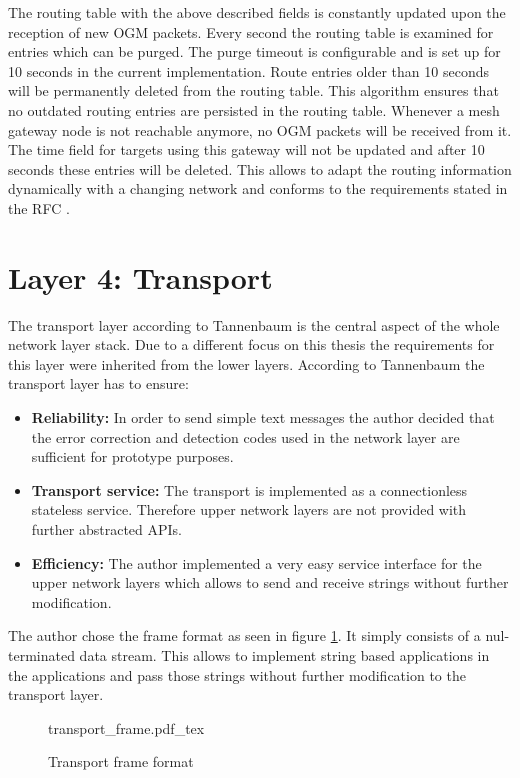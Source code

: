 The routing table with the above described fields is constantly updated upon the reception of new OGM packets. Every second the routing table is examined for entries which can be purged. The purge timeout is configurable and is set up for 10 seconds in the current implementation. Route entries older than 10 seconds will be permanently deleted from the routing table. This algorithm ensures that no outdated routing entries are persisted in the routing table. Whenever a mesh gateway node is not reachable anymore, no OGM packets will be received from it. The time field for targets using this gateway will not be updated and after 10 seconds these entries will be deleted. This allows to adapt the routing information dynamically with a changing network and conforms to the requirements stated in the RFC \cite{batmanrfc}.

\section{Layer 4: Transport}%
The transport layer according to Tannenbaum \cite{tannenbaum} is the central aspect of the whole network layer stack. Due to a different focus on this thesis the requirements for this layer were inherited from the lower layers. According to Tannenbaum the transport layer has to ensure:

\begin{itemize}
    \item \textbf{Reliability:} In order to send simple text messages the author decided that the error correction and detection codes used in the network layer are sufficient for prototype purposes.
    \item \textbf{Transport service:} The transport is implemented as a connectionless stateless service. Therefore upper network layers are not provided with further abstracted APIs.
    \item \textbf{Efficiency:} The author implemented a very easy service interface for the upper network layers which allows to send and receive strings without further modification.
\end{itemize}

The author chose the frame format as seen in figure \ref{fig:transport_frame}. It simply consists of a nul-terminated data stream. This allows to implement string based applications in the applications and pass those strings without further modification to the transport layer.

\begin{figure}[H]
    \centering
    {transport_frame.pdf_tex}
    \caption{Transport frame format}
    \label{fig:transport_frame}
\end{figure}

